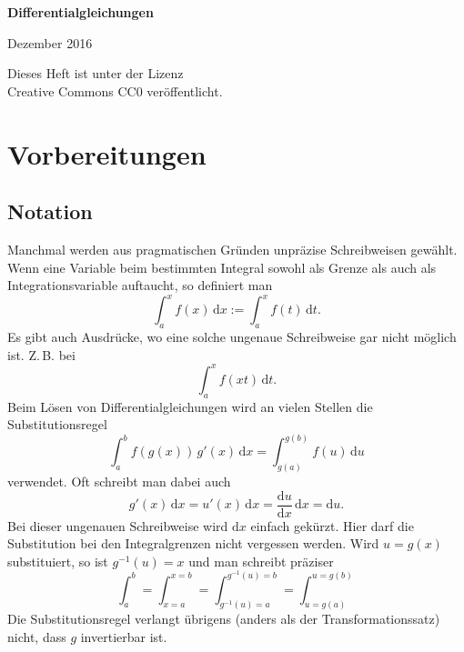 \documentclass[a4paper,10pt,fleqn,twocolumn,twoside,openany]{article}
\numberwithin{equation}{section}
\theoremstyle{definition}
\begin{document}
\setlength{\abovedisplayskip}{6pt}
\setlength{\belowdisplayskip}{6pt}
\setlength{\abovedisplayshortskip}{6pt}
\setlength{\belowdisplayshortskip}{6pt}

\begin{titlepage}
\centering
\phantom{x}

\vspace{20em}
{\noindent\Huge\sffamily\textbf{Differentialgleichungen}}

\vspace{2em}
{\Large Dezember 2016}\\
\end{titlepage}

\thispagestyle{empty}

\noindent
Dieses Heft ist unter der Lizenz\\
Creative Commons CC0 veröffentlicht.

\renewcommand{\contentsname}{
\normalfont\sffamily\bfseries\LARGE
Inhaltsverzeichnis}
\tableofcontents

\section{Vorbereitungen}
\subsection{Notation}
Manchmal werden aus pragmatischen Gründen unpräzise Schreibweisen
gewählt. Wenn eine Variable beim bestimmten Integral sowohl als Grenze
als auch als Integrationsvariable auftaucht, so definiert man
\begin{equation}
\int_a^x f(x)\,\mathrm dx := \int_a^x f(t)\,\mathrm dt.
\end{equation}
Es gibt auch Ausdrücke, wo eine solche ungenaue Schreibweise gar nicht
möglich ist. Z.\,B. bei
\begin{equation}
\int_a^x f(xt)\,\mathrm dt.
\end{equation}
Beim Lösen von Differentialgleichungen
wird an vielen Stellen die Substitutionsregel
\begin{equation}
\int_a^b f(g(x))\,g'(x)\,\mathrm dx
= \int_{g(a)}^{g(b)} f(u)\,\mathrm du
\end{equation}
verwendet. Oft schreibt man dabei auch
\begin{equation}
g'(x)\,\mathrm dx = u'(x)\,\mathrm dx
= \frac{\mathrm du}{\mathrm dx}\,\mathrm dx
= \mathrm du.
\end{equation}
Bei dieser ungenauen Schreibweise wird $\mathrm dx$ einfach
{\glqq}gekürzt{\grqq}. Hier darf die Substitution bei den
Integralgrenzen nicht vergessen werden. Wird $u=g(x)$ substituiert,
so ist $g^{-1}(u)=x$ und man schreibt präziser
\begin{equation}
\int_a^b = \int_{x=a}^{x=b} = \int_{g^{-1}(u)=a}^{g^{-1}(u)=b}
= \int_{u=g(a)}^{u=g(b)}
\end{equation}
Die Substitutionsregel verlangt übrigens (anders als der
Transformationssatz) nicht, dass $g$ invertierbar ist.
\end{document}
